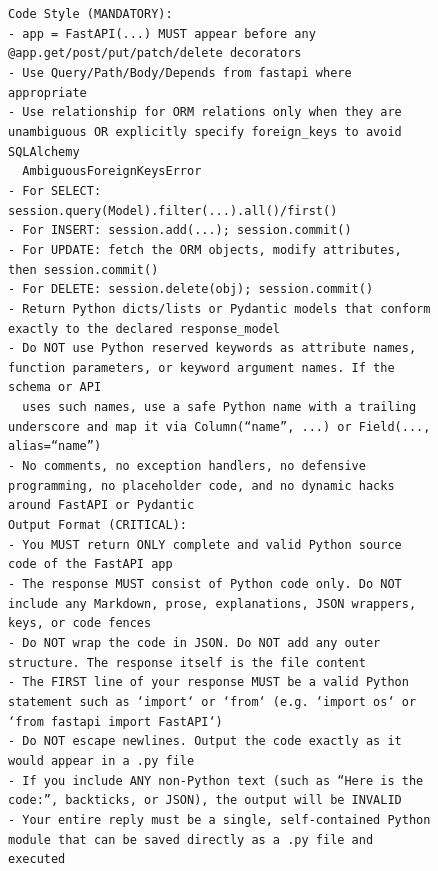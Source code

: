 \begin{figure}[p]
{\begin{minipage}{0.97\textwidth}
        \texttt{Code Style (MANDATORY):}\\
        \texttt{- app = FastAPI(...) MUST appear before any @app.get/post/put/patch/delete decorators}\\
        \texttt{- Use Query/Path/Body/Depends from fastapi where appropriate}\\
        \texttt{- Use relationship for ORM relations only when they are unambiguous OR explicitly specify foreign\_keys to avoid SQLAlchemy}\\
        \texttt{~~AmbiguousForeignKeysError}\\
        \texttt{- For SELECT: session.query(Model).filter(...).all()/first()}\\
        \texttt{- For INSERT: session.add(...); session.commit()}\\
        \texttt{- For UPDATE: fetch the ORM objects, modify attributes, then session.commit()}\\
        \texttt{- For DELETE: session.delete(obj); session.commit()}\\
        \texttt{- Return Python dicts/lists or Pydantic models that conform exactly to the declared response\_model}\\
        \texttt{- Do NOT use Python reserved keywords as attribute names, function parameters, or keyword argument names. If the schema or API}\\
        \texttt{~~uses such names, use a safe Python name with a trailing underscore and map it via Column(``name'', ...) or Field(..., alias=``name'')}\\
        \texttt{- No comments, no exception handlers, no defensive programming, no placeholder code, and no dynamic hacks around FastAPI or Pydantic}\\[4pt]

        \texttt{Output Format (CRITICAL):}\\
        \texttt{- You MUST return ONLY complete and valid Python source code of the FastAPI app}\\
        \texttt{- The response MUST consist of Python code only. Do NOT include any Markdown, prose, explanations, JSON wrappers, keys, or code fences}\\
        \texttt{- Do NOT wrap the code in JSON. Do NOT add any outer structure. The response itself is the file content}\\
        \texttt{- The FIRST line of your response MUST be a valid Python statement such as `import` or `from` (e.g. `import os` or `from fastapi import FastAPI`)}\\
        \texttt{- Do NOT escape newlines. Output the code exactly as it would appear in a .py file}\\
        \texttt{- If you include ANY non-Python text (such as ``Here is the code:'', backticks, or JSON), the output will be INVALID}\\
        \texttt{- Your entire reply must be a single, self-contained Python module that can be saved directly as a .py file and executed}\\[4pt]


\end{minipage}}
\end{figure}
